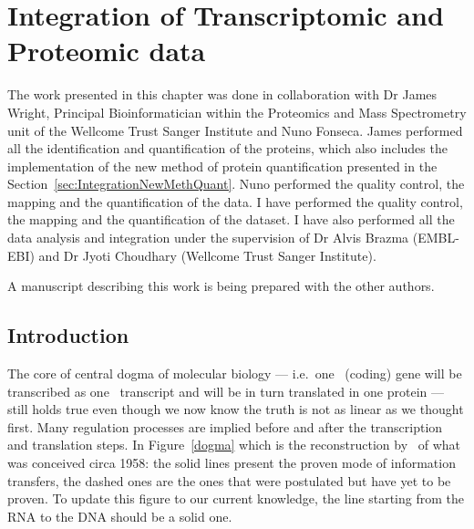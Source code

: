 
\chapter{Integration of Transcriptomic and Proteomic data}
\label{sec:Integration}
The work presented in this chapter was done in collaboration with Dr James Wright,
Principal Bioinformatician within the Proteomics and Mass Spectrometry unit of the
Wellcome Trust Sanger Institute and Nuno Fonseca. James performed all the
identification and quantification of the proteins, which also includes the
implementation of the new method of protein quantification presented in the
Section~\ref{sec:IntegrationNewMethQuant}. Nuno performed the quality
control, the mapping and the quantification of the  data.
I have performed the quality control, the mapping and the quantification of the
 dataset. I have also performed
all the data analysis and integration under the supervision of Dr Alvis Brazma
(EMBL-EBI) and Dr Jyoti Choudhary (Wellcome Trust Sanger Institute).

A manuscript describing this work is being prepared with the other authors.

\section{Introduction}
\label{sec:IntegrationIntro}
%
%

The core of central dogma of molecular biology --- i.e.\ one \DNA\ (coding) gene
will be transcribed as one \mRNA\ transcript and will be in turn translated in
one protein --- still holds true even though we now know the truth is not as
linear as we thought first. Many regulation processes are implied before
and after the transcription and translation steps.
In Figure~\ref{dogma} which is the reconstruction by~\cite{Crick:1958} of
what was conceived circa 1958: the solid lines present the proven mode of
information transfers, the dashed ones are the ones that were postulated but
have yet to be proven. To update this figure to our current knowledge, the line
starting from the RNA to the DNA should be a solid one.

